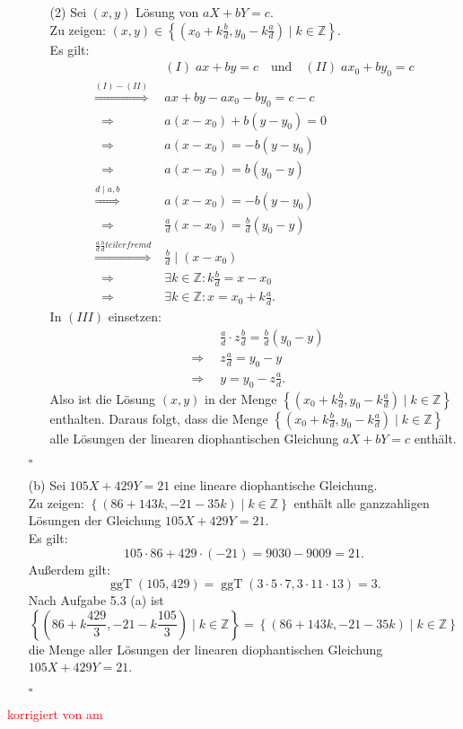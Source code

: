 \documentclass[12pt]{article}
\newcommand{\corr}[1]{\textcolor{red}{#1}}
\newcommand{\QED}{\begin{flushright} $\square$ \end{flushright}}
\newcommand{\df}{\enspace\Longrightarrow\enspace}
\newcommand{\ggT}{\operatorname{ggT}}
\begin{document}
\begin{enumerate}
\begin{enumerate}
		\item[(2)] Sei $(x,y)$ Lösung von $aX+bY=c$. \\
		Zu zeigen: $(x,y)\in\left\{(x_0+k\frac{b}{d},y_0-k\frac{a}{d})\mid k\in\mathbb{Z}\right\}$. \\
		Es gilt:
		\begin{align*}
			&(I)\; ax+by=c\quad\text{und}\quad (II)\; ax_0+by_0=c \\
			\overset{(I)-(II)}{\df} &ax+by-ax_0-by_0=c-c \\
			\df &a(x-x_0)+b(y-y_0)=0 \\
			\df &a(x-x_0)=-b(y-y_0) \\
			\df &a(x-x_0)=b(y_0-y) \\
			\overset{d\mid a,b}{\df} &a(x-x_0)=-b(y-y_0) \\
			\df &\frac{a}{d}(x-x_0)=\frac{b}{d}(y_0-y) \\
			\overset{\frac{a}{d}\frac{b}{d} teilerfremd}{\df} \;&\frac{b}{d}\mid(x-x_0) \\
			\df &\exists k\in\mathbb{Z}:k\frac{b}{d}=x-x_0 \\
			\df &\exists k\in\mathbb{Z}:x=x_0+k\frac{a}{d}.
		\end{align*}
		In $(III)$ einsetzen:
		\begin{align*}
			&\frac{a}{d}\cdot z\frac{b}{d}=\frac{b}{d}(y_0-y) \\
			\df &z\frac{a}{d}=y_0-y \\
			\df &y=y_0-z\frac{a}{d}.
		\end{align*}
		Also ist die Lösung $(x,y)$ in der Menge $\left\{(x_0+k\frac{b}{d},y_0-k\frac{a}{d})\mid k\in\mathbb{Z}\right\}$ enthalten. Daraus folgt, dass die Menge $\left\{(x_0+k\frac{b}{d},y_0-k\frac{a}{d})\mid k\in\mathbb{Z}\right\}$ alle Lösungen der linearen diophantischen Gleichung $aX+bY=c$ enthält.
	\end{enumerate}
	\QED
	
	\item[(b)] Sei $105X+429Y=21$ eine lineare diophantische Gleichung. \\
	Zu zeigen: $\left\{(86+143k,-21-35k)\mid k\in\mathbb{Z}\right\}$ enthält alle ganzzahligen Lösungen der Gleichung $105X+429Y=21$. \\
	Es gilt:
	$$105\cdot 86+429\cdot (-21)=9030-9009=21.$$
	Außerdem gilt:
	$$\ggT(105,429)=\ggT(3\cdot 5\cdot 7,3\cdot 11\cdot 13)=3.$$
	Nach Aufgabe 5.3 (a) ist $$\left\{(86+k\frac{429}{3},-21-k\frac{105}{3})\mid k\in\mathbb{Z}\right\}=\left\{(86+143k,-21-35k)\mid k\in\mathbb{Z}\right\}$$ die Menge aller Lösungen der linearen diophantischen Gleichung $105X+429Y=21$.
	\QED
\end{enumerate}


\bigskip

\corr{korrigiert von \hspace{1cm} am }
\end{document}

